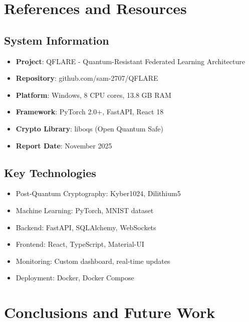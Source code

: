 \documentclass[12pt,a4paper]{article}
\begin{document}
\section{References and Resources}

\subsection{System Information}

\begin{itemize}
    \item \textbf{Project}: QFLARE - Quantum-Resistant Federated Learning Architecture
    \item \textbf{Repository}: github.com/sam-2707/QFLARE
    \item \textbf{Platform}: Windows, 8 CPU cores, 13.8 GB RAM
    \item \textbf{Framework}: PyTorch 2.0+, FastAPI, React 18
    \item \textbf{Crypto Library}: liboqs (Open Quantum Safe)
    \item \textbf{Report Date}: November 2025
\end{itemize}

\subsection{Key Technologies}

\begin{itemize}
    \item Post-Quantum Cryptography: Kyber1024, Dilithium5
    \item Machine Learning: PyTorch, MNIST dataset
    \item Backend: FastAPI, SQLAlchemy, WebSockets
    \item Frontend: React, TypeScript, Material-UI
    \item Monitoring: Custom dashboard, real-time updates
    \item Deployment: Docker, Docker Compose
\end{itemize}

\section{Conclusions and Future Work}
\end{document}

